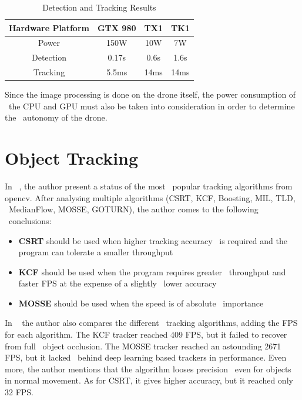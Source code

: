 \begin{table}[ht]
    \caption{Detection and Tracking Results}
    \centering
    \begin{tabular}{|c|c|c|c|}
        \hline\hline
        Hardware Platform & GTX 980 & TX1 & TK1 \\
        \hline
        Power & 150W & 10W & 7W \\
        Detection & 0.17s & 0.6s & 1.6s \\
        Tracking & 5.5ms & 14ms & 14ms \\
        \hline
    \end{tabular}
    \label{table:deep-drone-results}
\end{table}

Since the image processing is done on the drone itself, the power consumption of \
the CPU and GPU must also be taken into consideration in order to determine the \
autonomy of the drone.

\section{Object Tracking}
\label{sec:research-tracking}
In ~\cite{OpencvTracking}, the author present a status of the most \
popular tracking algorithms from opencv.
After analysing multiple algorithms (CSRT, KCF, Boosting, MIL, TLD, \
MedianFlow, MOSSE, GOTURN), the author comes to the following \
conclusions:
\begin{itemize}
    \item \textbf{CSRT} should be used when higher tracking accuracy \
            is required and the program can tolerate a smaller throughput
    \item \textbf{KCF} should be used when the program requires greater \
            throughput and faster FPS at the expense of a slightly \
            lower accuracy
    \item \textbf{MOSSE} should be used when the speed is of absolute \
            importance
\end{itemize}

In ~\cite{OpencvTracking2} the author also compares the different \
tracking algorithms, adding the FPS for each algorithm.
The KCF tracker reached 409 FPS, but it failed to recover from full \
object occlusion.
The MOSSE tracker reached an astounding 2671 FPS, but it lacked \
behind deep learning based trackers in performance.
Even more, the author mentions that the algorithm looses precision \
even for objects in normal movement.
As for CSRT, it gives higher accuracy, but it reached only 32 FPS.


